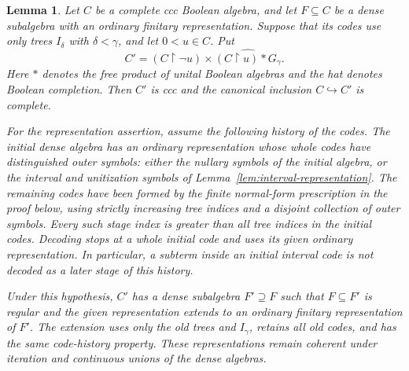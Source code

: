 \documentclass[11pt]{article}
\newtheorem{lemma}[theorem]{Lemma}
\theoremstyle{definition}
\theoremstyle{remark}
\newcommand{\restr}{\mathbin{\upharpoonright}}
\begin{document}
\begin{lemma}\label{lem:surgery}
Let $C$ be a complete ccc Boolean algebra, and let $F\subseteq C$ be a dense
subalgebra with an ordinary finitary representation.  Suppose that its codes
use only trees $I_\delta$ with $\delta<\gamma$, and let $0<u\in C$.  Put
\begin{equation}\label{eq:completed-surgery}
 C'=(C\restr\neg u)\times
       \widehat{(C\restr u)*G_\gamma}.
\end{equation}
Here $*$ denotes the free product of unital Boolean algebras and the hat
denotes Boolean completion.  Then $C'$ is ccc and the canonical inclusion
$C\hookrightarrow C'$ is complete.

For the representation assertion, assume the following history of the
codes.  The initial dense algebra has an ordinary representation whose
\emph{whole codes} have distinguished outer symbols: either the nullary
symbols of the initial algebra, or the interval and unitization symbols of
Lemma~\ref{lem:interval-representation}.  The remaining codes have been
formed by the finite normal-form prescription in the proof below, using
strictly increasing tree indices and a disjoint collection of outer symbols.
Every such stage index is greater than all tree indices in the initial codes.
Decoding stops at a whole initial code and uses its given ordinary
representation.  In particular, a subterm inside an initial interval code is
not decoded as a later stage of this history.

Under this hypothesis, $C'$ has a dense subalgebra $F'\supseteq F$ such that
$F\subseteq F'$ is regular and the given representation extends to an
ordinary finitary representation of $F'$.  The extension uses only the old
trees and $I_\gamma$, retains all old codes, and has the same code-history
property.  These representations remain coherent under iteration and
continuous unions of the dense algebras.
\end{lemma}
\end{document}
